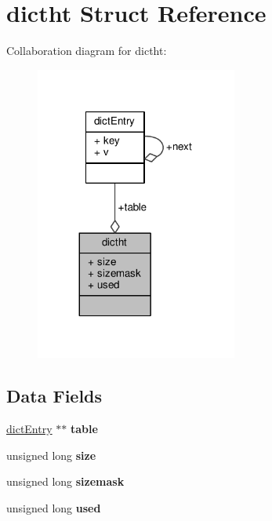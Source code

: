 \hypertarget{structdictht}{}\section{dictht Struct Reference}
\label{structdictht}


Collaboration diagram for dictht\+:\nopagebreak
\begin{figure}[H]
\begin{center}
\leavevmode
\includegraphics[width=188pt]{structdictht__coll__graph}
\end{center}
\end{figure}
\subsection*{Data Fields}
\begin{DoxyCompactItemize}
\item 
\mbox{\label{structdictht_af723bb6ba2e520eab1c53500e2e5c835}} 
\hyperlink{structdictEntry}{dict\+Entry} $\ast$$\ast$ {\bfseries table}
\item 
\mbox{\label{structdictht_ac8ef79c0bdbbddfc028e1c16794cd261}} 
unsigned long {\bfseries size}
\item 
\mbox{\label{structdictht_a72530b5a4f8cba9e264242004c273653}} 
unsigned long {\bfseries sizemask}
\item 
\mbox{\label{structdictht_ab67ac2d13aa52a10fb0085f93cf3d4dd}} 
unsigned long {\bfseries used}
\end{DoxyCompactItemize}


